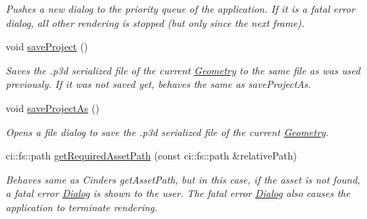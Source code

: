 \begin{DoxyCompactItemize}
\begin{DoxyCompactList}\small\item\em Pushes a new dialog to the priority queue of the application. If it is a fatal error dialog, all other rendering is stopped (but only since the next frame). \end{DoxyCompactList}\item 
\mbox{\label{classpepr3d_1_1_main_application_a3a21c18b808ee9cc2033f8a41ff64329}} 
void \mbox{\hyperlink{classpepr3d_1_1_main_application_a3a21c18b808ee9cc2033f8a41ff64329}{save\+Project}} ()
\begin{DoxyCompactList}\small\item\em Saves the .p3d serialized file of the current \mbox{\hyperlink{classpepr3d_1_1_geometry}{Geometry}} to the same file as was used previously. If it was not saved yet, behaves the same as save\+Project\+As. \end{DoxyCompactList}\item 
\mbox{\label{classpepr3d_1_1_main_application_a96e83b00512d96b952d231e2db1a634b}} 
void \mbox{\hyperlink{classpepr3d_1_1_main_application_a96e83b00512d96b952d231e2db1a634b}{save\+Project\+As}} ()
\begin{DoxyCompactList}\small\item\em Opens a file dialog to save the .p3d serialized file of the current \mbox{\hyperlink{classpepr3d_1_1_geometry}{Geometry}}. \end{DoxyCompactList}\item 
\mbox{\label{classpepr3d_1_1_main_application_ab805488ee0fd1ec3548e92667e6ad248}} 
ci\+::fs\+::path \mbox{\hyperlink{classpepr3d_1_1_main_application_ab805488ee0fd1ec3548e92667e6ad248}{get\+Required\+Asset\+Path}} (const ci\+::fs\+::path \&relative\+Path)
\begin{DoxyCompactList}\small\item\em Behaves same as Cinder\textquotesingle{}s get\+Asset\+Path, but in this case, if the asset is not found, a fatal error \mbox{\hyperlink{classpepr3d_1_1_dialog}{Dialog}} is shown to the user. The fatal error \mbox{\hyperlink{classpepr3d_1_1_dialog}{Dialog}} also causes the application to terminate rendering. \end{DoxyCompactList}\item 
\mbox{\label{classpepr3d_1_1_main_application_acfab9e02ede45fc96c2716370fdda96c}} 

\end{DoxyCompactItemize}
